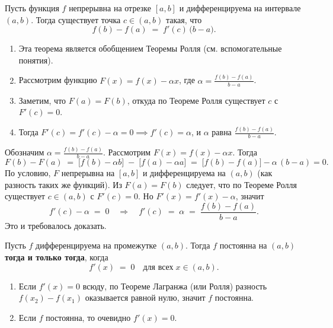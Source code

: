 
\begin{customtheorem}
	Пусть функция $f$ непрерывна на отрезке $[a,b]$ и дифференцируема на интервале $(a,b)$.
	Тогда существует точка $c \in (a,b)$ такая, что
	\[
		f(b) - f(a) \;=\; f'(c)\,\bigl(b - a\bigr).
	\]
\end{customtheorem}

\begin{proofplan}
	\begin{enumerate}
		\item Эта теорема является обобщением Теоремы Ролля (см. вспомогательные понятия).
		\item Рассмотрим функцию $F(x) = f(x) - \alpha x$, где
		      \(\displaystyle \alpha = \frac{f(b) - f(a)}{\,b - a\,}\).
		\item Заметим, что $F(a) = F(b)$, откуда по Теореме Ролля существует $c$ с $F'(c)=0$.
		\item Тогда $F'(c)=f'(c)-\alpha=0 \implies f'(c) = \alpha$, и $\alpha$ равна
		      $\tfrac{f(b)-f(a)}{\,b-a\,}$.
	\end{enumerate}
\end{proofplan}

\begin{customproof}
	Обозначим $\displaystyle \alpha = \frac{f(b)-f(a)}{\,b - a\,}$.
	Рассмотрим $F(x) = f(x) - \alpha x$. Тогда
	\[
		F(b) - F(a) \;=\; \bigl[f(b)-\alpha b\bigr] \;-\; \bigl[f(a)-\alpha a\bigr]
		\;=\; \bigl[f(b)-f(a)\bigr] - \alpha\,(b-a) = 0.
	\]
	По условию, $F$ непрерывна на $[a,b]$ и дифференцируема на $(a,b)$
	(как разность таких же функций).
	Из $F(a)=F(b)$ следует, что по Теореме Ролля существует $c\in(a,b)$
	с $F'(c)=0$. Но $F'(x)=f'(x)-\alpha$, значит
	\[
		f'(c) - \alpha \;=\; 0
		\quad\Longrightarrow\quad
		f'(c) \;=\; \alpha
		\;=\;
		\frac{f(b)-f(a)}{\,b - a\,}.
	\]
	Это и требовалось доказать.
\end{customproof}

\begin{customtheorem}
	Пусть $f$ дифференцируема на промежутке $(a,b)$.
	Тогда $f$ постоянна на $(a,b)$ \textbf{тогда и только тогда},
	когда
	\[
		f'(x) \;=\; 0 \quad\text{для всех}\; x \in (a,b).
	\]
\end{customtheorem}

\begin{proofplan}
	\begin{enumerate}
		\item Если $f'(x)=0$ всюду, по Теореме Лагранжа (или Ролля) разность $f(x_2)-f(x_1)$
		      оказывается равной нулю, значит $f$ постоянна.
		\item Если $f$ постоянна, то очевидно $f'(x)=0$.
	\end{enumerate}
\end{proofplan}

